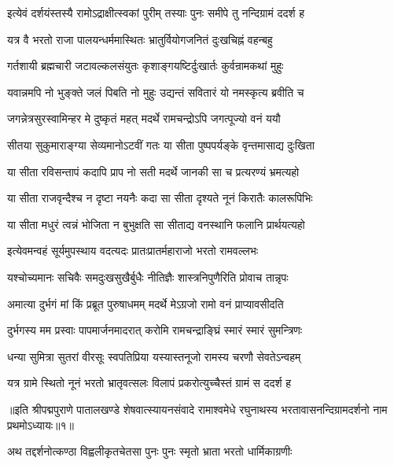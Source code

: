 \twolineshloka
{इत्येवं दर्शयंस्तस्यै रामोऽद्राक्षीत्स्वकां पुरीम्}
{तस्याः पुनः समीपे तु नन्दिग्रामं ददर्श ह}%

\twolineshloka
{यत्र वै भरतो राजा पालयन्धर्ममास्थितः}
{भ्रातुर्वियोगजनितं दुःखचिह्नं वहन्बहु}%

\twolineshloka
{गर्तशायी ब्रह्मचारी जटावल्कलसंयुतः}
{कृशाङ्गयष्टिर्दुःखार्तः कुर्वन्रामकथां मुहुः}%

\twolineshloka
{यवान्नमपि नो भुङ्क्ते जलं पिबति नो मुहुः}
{उद्यन्तं सवितारं यो नमस्कृत्य ब्रवीति च}%

\twolineshloka
{जगन्नेत्रसुरस्वामिन्हर मे दुष्कृतं महत्}
{मदर्थे रामचन्द्रोऽपि जगत्पूज्यो वनं ययौ}%

\twolineshloka
{सीतया सुकुमाराङ्ग्या सेव्यमानोऽटवीं गतः}
{या सीता पुष्पपर्यङ्के वृन्तमासाद्य दुःखिता}%

\twolineshloka
{या सीता रविसन्तापं कदापि प्राप नो सती}
{मदर्थे जानकी सा च प्रत्यरण्यं भ्रमत्यहो}%

\twolineshloka
{या सीता राजवृन्दैश्च न दृष्टा नयनैः कदा}
{सा सीता दृश्यते नूनं किरातैः कालरूपिभिः}%

\twolineshloka
{या सीता मधुरं त्वन्नं भोजिता न बुभुक्षति}
{सा सीताद्य वनस्थानि फलानि प्रार्थयत्यहो}%

\twolineshloka
{इत्येवमन्वहं सूर्यमुपस्थाय वदत्यदः}
{प्रातःप्रातर्महाराजो भरतो रामवल्लभः}%

\twolineshloka
{यश्चोच्यमानः सचिवैः समदुःखसुखैर्बुधैः}
{नीतिज्ञैः शास्त्रनिपुणैरिति प्रोवाच तान्नृपः}%

\twolineshloka
{अमात्या दुर्भगं मां किं प्रब्रूत पुरुषाधमम्}
{मदर्थे मेऽग्रजो रामो वनं प्राप्यावसीदति}%

\twolineshloka
{दुर्भगस्य मम प्रस्वाः पापमार्जनमादरात्}
{करोमि रामचन्द्राङ्घ्रिं स्मारं स्मारं सुमन्त्रिणः}%

\twolineshloka
{धन्या सुमित्रा सुतरां वीरसूः स्वपतिप्रिया}
{यस्यास्तनूजो रामस्य चरणौ सेवतेऽन्वहम्}%

\twolineshloka
{यत्र ग्रामे स्थितो नूनं भरतो भ्रातृवत्सलः}
{विलापं प्रकरोत्युच्चैस्तं ग्रामं स ददर्श ह}%

{॥इति श्रीपद्मपुराणे पातालखण्डे शेषवात्स्यायनसंवादे रामाश्वमेधे रघुनाथस्य भरतावासनन्दिग्रामदर्शनो नाम प्रथमोऽध्यायः॥१॥}

\resetShloka


\twolineshloka
{अथ तद्दर्शनोत्कण्ठा विह्वलीकृतचेतसा}
{पुनः पुनः स्मृतो भ्राता भरतो धार्मिकाग्रणीः}%

